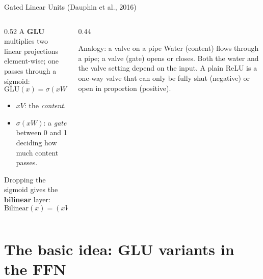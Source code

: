 \documentclass[aspectratio=169,11pt]{beamer}
\begin{document}
\begin{frame}{Gated Linear Units (Dauphin et al., 2016)}
  \begin{columns}[T]
    \begin{column}{0.52\textwidth}
      \small
      A \textbf{GLU} multiplies two linear projections element-wise; one passes through a sigmoid:
      \[
        \text{GLU}(x)=\sigma(xW+b)\otimes(xV+c)
      \]
      \begin{itemize}
        \item $xV$: the \emph{content}.
        \item $\sigma(xW)$: a \emph{gate} between 0 and 1 deciding how much content passes.
      \end{itemize}
      Dropping the sigmoid gives the \textbf{bilinear} layer:
      \[
        \text{Bilinear}(x)=(xW+b)\otimes(xV+c)
      \]
    \end{column}
    \begin{column}{0.44\textwidth}
      \begin{exampleblock}{Analogy: a valve on a pipe}
        \small
        Water (content) flows through a pipe; a valve (gate) opens or closes.
        Both the water and the valve setting depend on the input.
        A plain ReLU is a one-way valve that can only be fully shut (negative) or open in proportion (positive).
      \end{exampleblock}
    \end{column}
  \end{columns}
\end{frame}

\section{The basic idea: GLU variants in the FFN}
\end{document}
